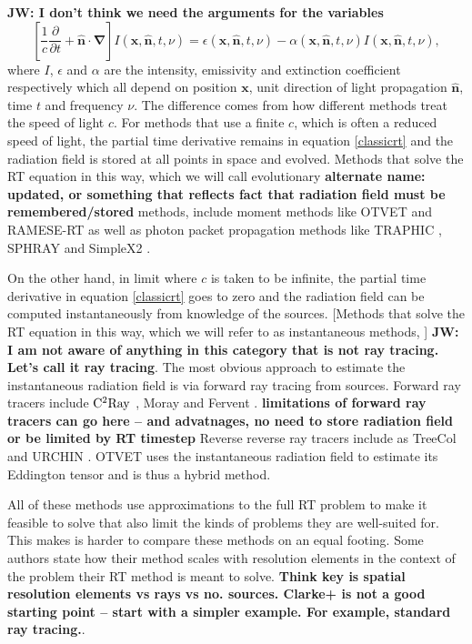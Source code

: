 \documentclass[fleqn,usenatbib]{mnras}
\begin{document}
{\bf JW: I don't think we need the arguments for the variables}
\begin{equation} \label{classicrt}
\left[ \frac{1}{c} \frac{\partial}{\partial t} + \mathbf{\hat{n} \cdot \nabla}
 \right] I\left(\mathbf{x}, \mathbf{\hat{n}}, t, \nu\right) = 
\epsilon\left(\mathbf{x}, \mathbf{\hat{n}}, t, \nu\right) - 
\alpha\left(\mathbf{x}, \mathbf{\hat{n}}, t, \nu\right) 
I\left(\mathbf{x}, \mathbf{\hat{n}}, t, \nu\right),
\end{equation}
where $I$, $\epsilon$ and $\alpha$ are the intensity, emissivity and extinction
 coefficient respectively which all depend on position $\mathbf{x}$, 
unit direction of light propagation $\mathbf{\hat{n}}$, time $t$ and frequency 
$\nu$. The difference comes from how different methods treat the speed of 
light $c$. For methods that use a finite $c$, which is often a 
reduced speed of light, the partial time derivative remains in equation 
\ref{classicrt} and the radiation field is stored at all points in space and evolved. Methods 
that solve the RT equation in this way, which we will call evolutionary 
{\bf alternate name: updated, or something that reflects fact that radiation field
must be remembered/stored}
methods, include moment methods like OTVET \citep{gnedinAbel01} and  RAMESE-RT 
\citep{rosdahlTeyssier15} as well as photon packet propagation methods like 
TRAPHIC \citep{pawlikSchaye08}, SPHRAY \citep{altayEt08} and SimpleX2 
\citep{paardekooperEt10}. 

On the other hand, in limit where $c$ is taken to be 
infinite, the partial time derivative in equation \ref{classicrt} goes to zero 
and the radiation field can be computed instantaneously from knowledge of the sources.
[Methods that solve the
 RT equation in this way, which we will refer to as instantaneous methods, ]
{\bf JW: I am not aware of anything in this category that is not ray tracing.  Let's call it ray tracing}.
The most obvious approach to estimate the instantaneous radiation field is via forward ray tracing from sources.  Forward ray tracers include $\rm C^2Ray$ \citep{mellemaEt06a}, Moray 
\citep{wiseAbel11} and Fervent \citep{baczynskiEt15}.   
{\bf limitations of forward ray tracers can go here -- and advatnages, no need to store radiation field or be limited by RT timestep}
Reverse reverse ray 
tracers include as TreeCol \citep{clarkEt12} and URCHIN \citep{altayTheuns13}. 
OTVET uses the instantaneous radiation field to estimate its Eddington tensor and is thus a
hybrid method.

All of these methods use approximations to the full RT problem to make it
feasible to solve that also limit the
kinds of problems they are well-suited for.  This 
makes is harder to compare these methods on an equal footing.  Some 
authors state how their method scales with resolution elements in the context 
of the problem their RT method is meant to solve. 
{\bf Think key is spatial resolution elements vs rays vs no. sources.
Clarke+ is not a good starting point -- start with a simpler example.  For example, standard ray tracing.}.
\end{document}

